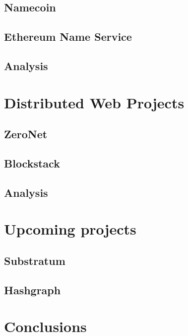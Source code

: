 \documentclass[mscthesis]{usiinfthesis}
\begin{document}
\section{Namecoin}\label{proj:namecoin}

\section{Ethereum Name Service}\label{proj:ens}

\section{Analysis}


\chapter{Distributed Web Projects}

\section{ZeroNet}\label{proj:zeronet}

\section{Blockstack}\label{proj:blockstack}

\section{Analysis}


\chapter{Upcoming projects}

\section{Substratum}

\section{Hashgraph}


\chapter{Conclusions}

\end{document}
